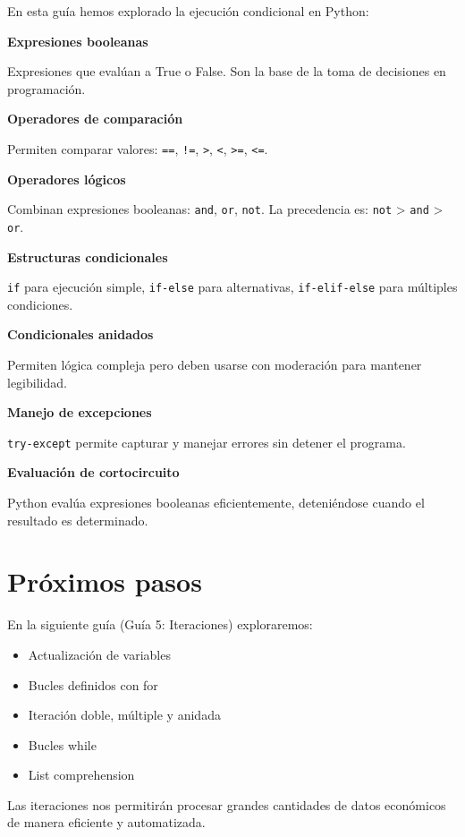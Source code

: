 \documentclass[
  doc,
  floatsintext,
  longtable,
  a4paper,
  nolmodern,
  notxfonts,
  notimes,
  12pt,
  colorlinks=true,linkcolor=blue,citecolor=blue,urlcolor=blue]{apa7}
\providecommand{\tightlist}{%
  \setlength{\itemsep}{0pt}\setlength{\parskip}{0pt}}
\begin{document}
En esta guía hemos explorado la ejecución condicional en Python:

\textbf{Expresiones booleanas}

Expresiones que evalúan a True o False. Son la base de la toma de
decisiones en programación.

\textbf{Operadores de comparación}

Permiten comparar valores: \texttt{==}, \texttt{!=},
\texttt{\textgreater{}}, \texttt{\textless{}}, \texttt{\textgreater{}=},
\texttt{\textless{}=}.

\textbf{Operadores lógicos}

Combinan expresiones booleanas: \texttt{and}, \texttt{or}, \texttt{not}.
La precedencia es: \texttt{not} \textgreater{} \texttt{and}
\textgreater{} \texttt{or}.

\textbf{Estructuras condicionales}

\texttt{if} para ejecución simple, \texttt{if-else} para alternativas,
\texttt{if-elif-else} para múltiples condiciones.

\textbf{Condicionales anidados}

Permiten lógica compleja pero deben usarse con moderación para mantener
legibilidad.

\textbf{Manejo de excepciones}

\texttt{try-except} permite capturar y manejar errores sin detener el
programa.

\textbf{Evaluación de cortocircuito}

Python evalúa expresiones booleanas eficientemente, deteniéndose cuando
el resultado es determinado.

\section{Próximos pasos}\label{pruxf3ximos-pasos}

En la siguiente guía (Guía 5: Iteraciones) exploraremos:

\begin{itemize}
\tightlist
\item
  Actualización de variables
\item
  Bucles definidos con for
\item
  Iteración doble, múltiple y anidada
\item
  Bucles while
\item
  List comprehension
\end{itemize}

Las iteraciones nos permitirán procesar grandes cantidades de datos
económicos de manera eficiente y automatizada.
\end{document}
